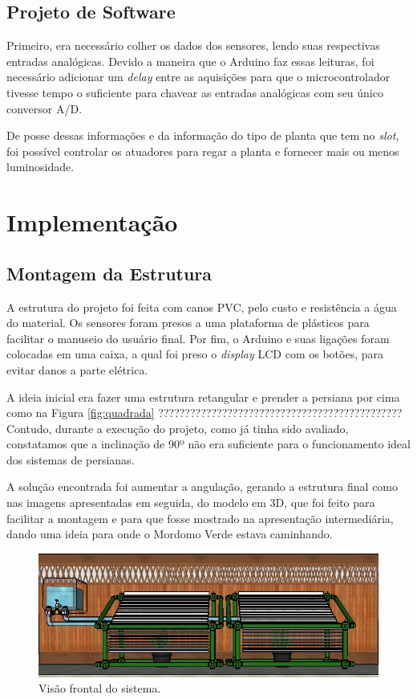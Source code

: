 \documentclass[a4paper,12pt]{report}
\begin{document}
	\section{Projeto de Software}
	Primeiro, era necessário colher os dados dos sensores, lendo suas respectivas entradas analógicas. Devido a maneira que o Arduino faz essas leituras, foi necessário adicionar um \textit{delay} entre as aquisições para que o microcontrolador tivesse tempo o suficiente para chavear as entradas analógicas com seu único conversor A/D.
	
	De posse dessas informações e da informação do tipo de planta que tem no \textit{slot}, foi possível controlar os atuadores para regar a planta e fornecer mais ou menos luminosidade.
	

\cleardoublepage
\chapter{Implementação}
	\label{cap:Implementacao}

\section{Montagem da Estrutura}
	A estrutura do projeto foi feita com canos PVC, pelo custo e resistência a água do material. Os sensores foram presos a uma plataforma de plásticos para facilitar o manuseio do usuário final. Por fim, o Arduino e suas ligações foram colocadas em uma caixa, a qual foi preso o \textit{display} LCD com os botões, para evitar danos a parte elétrica.
	
	A ideia inicial era fazer uma estrutura retangular e prender a persiana por cima como na Figura \ref{fig:quadrada} ??????????????????????????????????????????????
	Contudo, durante a execução do projeto, como já tinha sido avaliado, constatamos que a inclinação de 90º não era suficiente para o funcionamento ideal dos sistemas de persianas.
	
	A solução encontrada foi aumentar a angulação, gerando a estrutura final como nas imagens apresentadas em seguida, do modelo em 3D, que foi feito para facilitar a montagem e para que fosse mostrado na apresentação intermediária, dando uma ideia para onde o Mordomo Verde estava caminhando.
	
	
	
	\begin{figure}[!h]
	\centering
	\includegraphics[width=1.0\linewidth]{figs/estru1}
	\caption{Visão frontal do sistema.}
	\label{fig:estru1}
	\end{figure}
\end{document}
